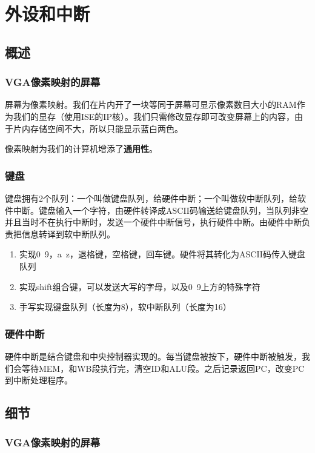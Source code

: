 \section{外设和中断}

\subsection{概述}

\subsubsection{VGA像素映射的屏幕}

屏幕为像素映射。我们在片内开了一块等同于屏幕可显示像素数目大小的RAM作为我们的显存（使用ISE的IP核）。我们只需修改显存即可改变屏幕上的内容，由于片内存储空间不大，所以只能显示蓝白两色。

像素映射为我们的计算机增添了\textbf{通用性}。

\subsubsection{键盘}
键盘拥有2个队列：一个叫做键盘队列，给硬件中断；一个叫做软中断队列，给软件中断。键盘输入一个字符，由硬件转译成ASCII码输送给键盘队列，当队列非空并且当时不在执行中断时，发送一个硬件中断信号，执行硬件中断。由硬件中断负责把信息转译到软中断队列。

\begin{enumerate}
    \item 实现0~9，a~z，退格键，空格键，回车键。硬件将其转化为ASCII码传入键盘队列
    \item 实现shift组合键，可以发送大写的字母，以及0~9上方的特殊字符
    \item 手写实现键盘队列（长度为8），软中断队列（长度为16）
\end{enumerate}


\subsubsection{硬件中断}

硬件中断是结合键盘和中央控制器实现的。每当键盘被按下，硬件中断被触发，我们会等待MEM，和WB段执行完，清空ID和ALU段。之后记录返回PC，改变PC到中断处理程序。


\subsection{细节}

\subsubsection{VGA像素映射的屏幕}

